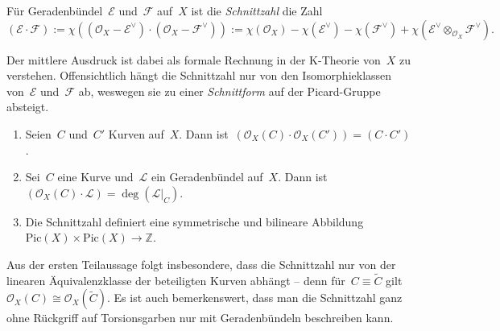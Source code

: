 \documentclass[a4paper,ngerman,12pt]{scrartcl}
\theoremstyle{definition}
\theoremstyle{plain}
\theoremstyle{remark}
\newcommand{\ZZ}{\mathbb{Z}}
\newcommand{\E}{\mathcal{E}}
\newcommand{\F}{\mathcal{F}}
\renewcommand{\L}{\mathcal{L}}
\renewcommand{\O}{\mathcal{O}}
\newcommand{\Pic}{\mathrm{Pic}}
\begin{document}
\begin{defn}Für Geradenbündel~$\E$ und~$\F$ auf~$X$ ist die \emph{Schnittzahl}
die Zahl
\[ (\E \cdot \F) :=
  \chi((\O_X - \E^\vee) \cdot (\O_X - \F^\vee)) :=
  \chi(\O_X) - \chi(\E^\vee) - \chi(\F^\vee) + \chi(\E^\vee \otimes_{\O_X}
  \F^\vee). \]
\end{defn}
Der mittlere Ausdruck ist dabei als formale Rechnung in der K-Theorie von~$X$
zu verstehen. Offensichtlich hängt die Schnittzahl nur von den
Isomorphieklassen von~$\E$ und~$\F$ ab, weswegen sie zu einer
\emph{Schnittform} auf der Picard-Gruppe absteigt.

\begin{prop}\begin{enumerate}
\item Seien~$C$ und~$C'$ Kurven auf~$X$. Dann ist~$(\O_X(C) \cdot \O_X(C')) = (C
\cdot C')$.
\item Sei~$C$ eine Kurve und~$\L$ ein Geradenbündel auf~$X$. Dann ist~$(\O_X(C)
\cdot \L) = \deg(\L|_C)$.
\item Die Schnittzahl definiert eine symmetrische und bilineare Abbildung
$\Pic(X) \times \Pic(X) \to \ZZ$.
\end{enumerate}\end{prop}

Aus der ersten Teilaussage folgt insbesondere, dass die Schnittzahl nur von der
linearen Äquivalenzklasse der beteiligten Kurven abhängt -- denn für~$C \equiv
\widetilde C$ gilt~$\O_X(C) \cong \O_X(\widetilde C)$. Es ist auch
bemerkenswert, dass man die Schnittzahl ganz ohne Rückgriff auf Torsionsgarben
nur mit Geradenbündeln beschreiben kann.
\end{document}
